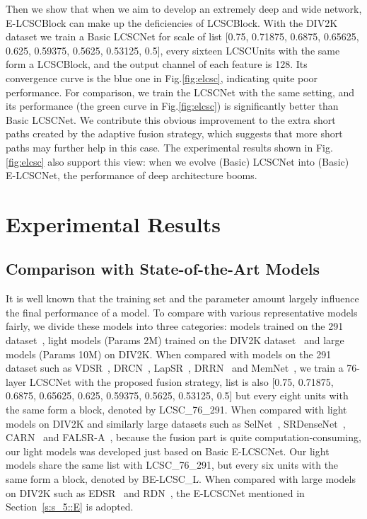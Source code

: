 \documentclass[journal]{IEEEtran}
\begin{document}
Then we show that when we aim to develop an extremely deep and wide network, E-LCSCBlock can make up the deficiencies of LCSCBlock. With the DIV2K dataset we train a Basic LCSCNet for  scale of  list [0.75, 0.71875, 0.6875, 0.65625, 0.625, 0.59375, 0.5625, 0.53125, 0.5], every sixteen LCSCUnits with the same  form a LCSCBlock, and the output channel of each feature is 128. Its convergence curve is the blue one in Fig.\ref{fig:elcsc}, indicating quite poor performance. For comparison, we train the LCSCNet with the same setting, and its performance (the green curve in Fig.\ref{fig:elcsc}) is significantly better than Basic LCSCNet. We contribute this obvious improvement to the extra short paths created by the adaptive fusion strategy, which suggests that more short paths may further help in this case. The experimental results shown in Fig.\ref{fig:elcsc} also support this view: when we evolve (Basic) LCSCNet into (Basic) E-LCSCNet, the performance of deep architecture booms.


\section{Experimental Results}\label{s:s_6}

\subsection{Comparison with State-of-the-Art Models}

It is well known that the training set and the parameter amount largely influence the final performance of a model. To compare with various representative models fairly, we divide these models into three categories: models trained on the 291 dataset~\cite{yang2010image,martin2001database}, light models (Params  2M) trained on the DIV2K dataset~\cite{Agustsson_2017_CVPR_Workshops} and large models (Params  10M) on DIV2K. When compared with models on the 291 dataset such as VDSR~\cite{kim2016accurate}, DRCN~\cite{kim2016deeply}, LapSR~\cite{LapSRN}, DRRN~\cite{tai2017image} and MemNet~\cite{Tai-MemNet-2017}, we train a 76-layer LCSCNet with the proposed fusion strategy,  list is also [0.75, 0.71875, 0.6875, 0.65625, 0.625, 0.59375, 0.5625, 0.53125, 0.5] but every eight units with the same  form a block, denoted by LCSC\_76\_291. When compared with light models on DIV2K and similarly large datasets such as SelNet~\cite{choi2017deep}, SRDenseNet~\cite{tong2017image}, CARN~\cite{ahn2018fast} and FALSR-A~\cite{chu2019fast}, because the fusion part is quite computation-consuming, our light models was developed just based on Basic E-LCSCNet. Our light models share the same  list with LCSC\_76\_291, but every six units with the same  form a block, denoted by BE-LCSC\_L. When compared with large models on DIV2K such as EDSR~\cite{lim2017enhanced} and RDN~\cite{zhang2018residual}, the E-LCSCNet mentioned in Section~\ref{s:s_5::E} is adopted. 
\end{document}
